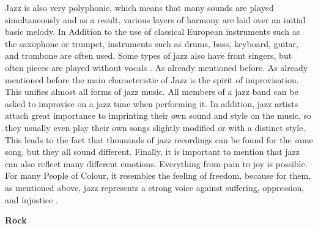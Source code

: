 Jazz is also very polyphonic, which means that many sounds are played simultaneously and as a result,
various layers of harmony are laid over an initial basic melody.
In Addition to the use of classical European instruments such as the saxophone or trumpet,
instruments such as drums, bass, keyboard, guitar, and trombone are often used.
Some types of jazz also have front singers, but often pieces are played without vocals \cite{2020MasterclassJazz}.
As already mentioned before. As already mentioned before the main characteristic of Jazz is
the spirit of improvisation. This unifies almost all forms of jazz music.
All members of a jazz band can be asked to improvise on a jazz tune when performing it.
In addition, jazz artists attach great importance to imprinting their own sound and style on the music,
so they usually even play their own songs slightly modified or with a distinct style.
This leads to the fact that thousands of jazz recordings can be found for the same song,
but they all sound different.
Finally, it is important to mention that jazz can also reflect many different emotions.
Everything from pain to joy is possible. For many People of Colour, it resembles the feeling of freedom,
because for them, as mentioned above, jazz represents a strong voice against suffering, oppression,
and injustice \cite{MusicalDictJazz}.

\textbf{Rock}

